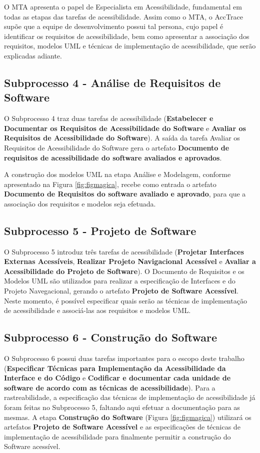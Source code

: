 \documentclass[runningheads,a4paper]{llncs}
\begin{document}
O MTA apresenta o papel de Especialista em Acessibilidade, fundamental em todas
as etapas das tarefas de acessibilidade. Assim como o MTA, o AccTrace supõe que
a equipe de desenvolvimento possui tal persona, cujo papel é identificar os
requisitos de acessibilidade, bem como apresentar a associação dos requisitos,
modelos UML e técnicas de implementação de acessibilidade, que serão explicadas
adiante.

\subsection{Subprocesso 4 - Análise de Requisitos de Software}

O Subprocesso 4 traz duas tarefas de acessibilidade (\textbf{Estabelecer e
Documentar os Requisitos de Acessibilidade do Software} e \textbf{Avaliar os
Requisitos de Acessibilidade do Software}). A saída da tarefa {Avaliar os
Requisitos de Acessibilidade do Software} gera o artefato \textbf{Documento de
requisitos de acessibilidade do software avaliados e aprovados}.

A construção dos modelos UML na etapa Análise e Modelagem, conforme apresentado
na Figura \ref{fig:figmagica}, recebe como entrada o artefato \textbf{Documento
de Requisitos do software avaliado e aprovado}, para que a associação dos
requisitos e modelos seja efetuada.

\subsection{Subprocesso 5 - Projeto de Software}

O Subprocesso 5 introduz três tarefas de acessibilidade (\textbf{Projetar
Interfaces Externas Acessíveis}, \textbf{Realizar Projeto Navigacional
Acessível} e \textbf{Avaliar a Acessibilidade do Projeto de Software}). O
Documento de Requisitos e os Modelos UML são utilizados para realizar a
especificação de Interfaces e do Projeto Navegacional, gerando o artefato
\textbf{Projeto de Software Acessível}. Neste momento, é possível especificar
quais serão as técnicas de implementação de acessibilidade e associá-las aos
requisitos e modelos UML.

\subsection{Subprocesso 6 - Construção do Software}

O Subprocesso 6 possui duas tarefas importantes para o escopo deste trabalho
(\textbf{Especificar Técnicas para Implementação da Acessibilidade da
Interface e do Código} e \textbf{Codificar e documentar cada unidade de software
de acordo com as técnicas de acessibilidade}). Para a rastreabilidade, a
especificação das técnicas de implementação de acessibilidade já foram feitas no
Subprocesso 5, faltando aqui efetuar a documentação para as mesmas. A etapa
\textbf{Construção do Software} (Figura \ref{fig:figmagica}) utilizará os
artefatos \textbf{Projeto de Software Acessível} e as especificações de técnicas
de implementação de acessibilidade para finalmente permitir a construção do
Software acessível.
\end{document}
